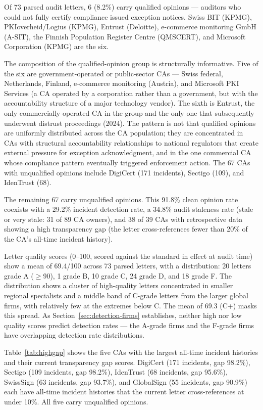 \documentclass[10pt,twocolumn,letterpaper]{article}
\begin{document}
Of 73 parsed audit letters, 6 (8.2\%) carry qualified opinions ---
auditors who could not fully certify compliance issued exception
notices. Swiss BIT (KPMG), PKIoverheid/Logius (KPMG), Entrust
(Deloitte), e-commerce monitoring GmbH (A-SIT), the Finnish
Population Register Centre (QMSCERT), and Microsoft Corporation
(KPMG) are the six.

The composition of the qualified-opinion group is structurally
informative. Five of the six are government-operated or public-sector CAs ---
Swiss federal, Netherlands, Finland, e-commerce monitoring (Austria),
and Microsoft PKI Services (a CA operated by a corporation rather
than a government, but with the accountability structure of a major
technology vendor). The sixth is Entrust, the only commercially-operated CA
in the group and the only one that subsequently underwent distrust
proceedings (2024). The pattern is not that qualified opinions are
uniformly distributed across the CA population; they are concentrated
in CAs with structural accountability relationships to national
regulators that create external pressure for exception acknowledgment,
and in the one commercial CA whose compliance pattern eventually
triggered enforcement action. The 67 CAs with unqualified
opinions include DigiCert (171 incidents), Sectigo (109), and
IdenTrust (68).

The remaining 67 carry unqualified opinions. This 91.8\% clean
opinion rate coexists with a 29.2\% incident detection rate, a 34.8\%
audit staleness rate (stale or very stale: 31 of 89 CA owners), and
38 of 39 CAs with retrospective data showing a high transparency gap
(the letter cross-references fewer than 20\% of the CA's all-time incident history).

Letter quality scores (0--100, scored against the standard in effect
at audit time) show a mean of 69.4/100 across 73 parsed letters, with
a distribution: 20 letters grade A ($\geq$90), 1 grade B,
10 grade C, 24 grade D, and 18 grade F. The distribution shows a cluster
of high-quality letters concentrated in smaller regional specialists
and a middle band of C-grade letters from the larger global firms, with
relatively few at the extremes below C.
The mean of 69.3 (C+) masks this spread. As Section~\ref{sec:detection-firms} establishes,
neither high nor low quality scores predict detection rates --- the
A-grade firms and the F-grade firms have overlapping detection
rate distributions.

Table~\ref{tab:highgap} shows the five CAs with the largest all-time
incident histories and their current transparency gap scores. DigiCert
(171 incidents, gap 98.2\%), Sectigo (109 incidents, gap 98.2\%),
IdenTrust (68 incidents, gap 95.6\%), SwissSign (63 incidents, gap
93.7\%), and GlobalSign (55 incidents, gap 90.9\%) each have
all-time incident histories that the current letter cross-references
at under 10\%. All five carry unqualified opinions.
\end{document}

